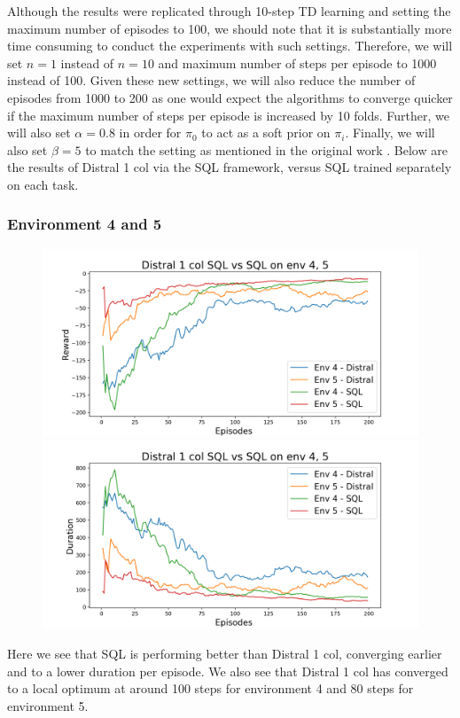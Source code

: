\documentclass[12pt]{report}
\begin{document}
Although the results were replicated through 10-step TD learning and setting the maximum number of episodes to 100, we should note that it is substantially more time consuming to conduct the experiments with such settings. Therefore, we will set $n=1$ instead of $n=10$ and maximum number of steps per episode to 1000 instead of 100. Given these new settings, we will also reduce the number of episodes from 1000 to 200 as one would expect the algorithms to converge quicker if the maximum number of steps per episode is increased by 10 folds. Further, we will also set $\alpha = 0.8$ in order for $\pi_0$ to act as a soft prior on $\pi_i$. Finally, we will also set $\beta = 5$ to match the setting as mentioned in the original work \cite{teh2017distral}. Below are the results of Distral 1 col via the SQL framework, versus SQL trained separately on each task.

\subsubsection{Environment 4 and 5}
\begin{figure}[H]
\centering
\begin{minipage}{.5\textwidth}
\centering
\includegraphics[width=\textwidth]{figs/d1_col_sql/d1_col_sql_4_5_rwd.png}
\end{minipage}%
\centering
\begin{minipage}{.5\textwidth}
\centering
\includegraphics[width=\textwidth]{figs/d1_col_sql/d1_col_sql_4_5_dur.png}
\end{minipage}%
\end{figure}
Here we see that SQL is performing better than Distral 1 col, converging earlier and to a lower duration per episode. We also see that Distral 1 col has converged to a local optimum at around 100 steps for environment 4 and 80 steps for environment 5.
\end{document}
